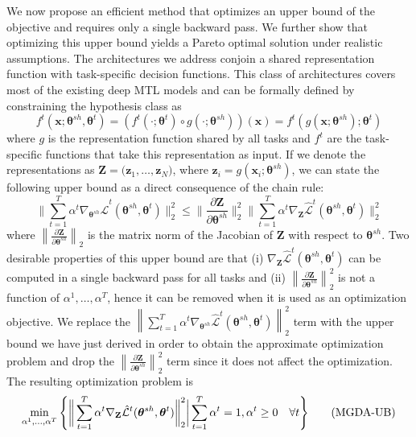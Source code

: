 \documentclass{article}
\def\xx{\mathbf{x}}
\def\zz{\mathbf{z}}
\def\ZZ{\mathbf{Z}}
\def\lL{\mathcal{L}}
\def\btheta{{\bm\theta}}
\newcommand{\eqname}[1]{\tag*{#1}}
\begin{document}
We now propose an efficient method that optimizes an upper bound of the objective and requires only a single backward pass. We further show that optimizing this upper bound yields a Pareto optimal solution under realistic assumptions. The architectures we address conjoin a shared representation function with task-specific decision functions. This class of architectures covers most of the existing deep MTL models and can be formally defined by constraining the hypothesis class as
\begin{equation}
f^t(\xx;\btheta^{sh},\btheta^t) = (f^t(\cdot; \btheta^t) \circ g(\cdot; \btheta^{sh})) (\xx)  = f^t( g(\xx; \btheta^{sh}); \btheta^t  )
\end{equation}
where $g$ is the representation function shared by all tasks and $f^t$ are the task-specific functions that take this representation as input. If we denote the representations as \mbox{$\ZZ = \big(\zz_1,\ldots,\zz_N \big)$}, where $\zz_i = g(\xx_i;\btheta^{sh})$, we can state the following upper bound as a direct consequence of the chain rule:
\begin{equation}
  \Bigg\| \sum_{t=1}^T \alpha^t \nabla_{\btheta^{sh}}  \hat{\lL}^t(\btheta^{sh},\btheta^t) \Bigg\|_2^2  \leq    \Bigg\|\frac{\partial \ZZ}{\partial \btheta^{sh}}\Bigg\|_2^2 \Bigg\| \sum_{t=1}^T \alpha^t  \nabla_{\ZZ}  \hat{\lL}^t(\btheta^{sh},\btheta^t) \Bigg\|_2^2
  \end{equation}
where  $\left\|\frac{\partial \ZZ}{\partial \btheta^{sh}}\right\|_2$ is the matrix norm of the Jacobian of $\ZZ$ with respect to $\btheta^{sh}$. Two desirable properties of this upper bound are that (i) $\nabla_{\ZZ} \hat{\lL}^t(\btheta^{sh},\btheta^t)$ can be computed in a single backward pass for all tasks and (ii) $\left\|\frac{\partial \ZZ}{\partial \btheta^{sh}}\right\|_2^2 $ is not a function of $\alpha^1,\ldots ,\alpha^T$, hence it can be removed when it is used as an optimization objective. We replace the $\left\| \sum_{t=1}^T \alpha^t \nabla_{\btheta^{sh}}  \hat{\lL}^t(\btheta^{sh},\btheta^t) \right\|_2^2$ term with the upper bound we have just derived in order to obtain the approximate optimization problem and drop the $\left\|\frac{\partial \ZZ}{\partial \btheta^{sh}}\right\|_2^2 $ term since it does not affect the optimization. The resulting optimization problem is
\begin{equation}
\min_{\alpha^1,\ldots,\alpha^T}  \Bigg\{  \bigg\| \sum_{t=1}^T \alpha^t  \nabla_{\ZZ}  \hat{\lL}^t(\btheta^{sh},\btheta^t) \bigg\|_2^2 \bigg |  \sum_{t=1}^T \alpha^t = 1, \alpha^t \geq 0 \quad \forall t \Bigg\} \\
\eqname{(MGDA-UB)}
\label{eq:approx}
\end{equation}
\end{document}

